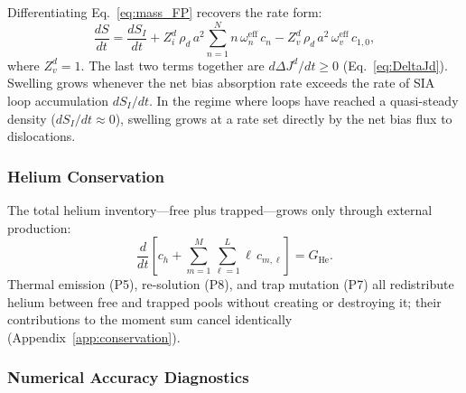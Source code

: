 Differentiating Eq.~\eqref{eq:mass_FP} recovers the rate form:
\begin{equation}\label{eq:dSdt}
    \frac{dS}{dt}
    = \frac{dS_I}{dt}
    + Z_i^d\,\rho_d\,a^2\sum_{n=1}^{N} n\,\omega_n^{\mathrm{eff}}\,c_n
    - Z_v^d\,\rho_d\,a^2\,\omega_v^{\mathrm{eff}}\,c_{1,0},
\end{equation}
where $Z_v^d = 1$. The last two terms together are $d\Delta J^d/dt \geq 0$
(Eq.~\ref{eq:DeltaJd}). Swelling grows whenever the net bias absorption
rate exceeds the rate of SIA loop accumulation $dS_I/dt$. In the regime
where loops have reached a quasi-steady density ($dS_I/dt \approx 0$),
swelling grows at a rate set directly by the net bias flux to dislocations.

\subsubsection{Helium Conservation}

The total helium inventory---free plus trapped---grows only through
external production:
\begin{equation}\label{eq:mass_He}
    \frac{d}{dt}\!\left[c_h
    + \sum_{m=1}^{M}\sum_{\ell=1}^{L} \ell\,c_{m,\ell}\right]
    = G_{\mathrm{He}}.
\end{equation}
Thermal emission (P5), re-solution (P8), and trap mutation (P7) all
redistribute helium between free and trapped pools without creating or
destroying it; their contributions to the moment sum cancel identically
(Appendix~\ref{app:conservation}).

\subsubsection{Numerical Accuracy Diagnostics}
\label{sec:conservation_check}

